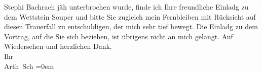 \begin{ledgroupsized}[t]{13cm}
{                  Stephi Bachrach}{}\label{K_L03019-2h} jäh unterbrochen wurde, finde ich Ihre freundliche Einladg zu
               dem Wettstein Souper und
                  bitte Sie zugleich mein Fernbleiben mit Rücksicht auf diesen
               Trauerfall zu entschuldigen, der mich sehr tief bewegt.\pend
           \pstart
           Die Einladg zu dem Vortrag, auf die Sie sich beziehen, ist übrigens nicht an mich
               gelangt.\pend
           \pstart
           Auf Wiedersehen und herzlichen Dank. {\\[\baselineskip]}Ihr {\\[\baselineskip]}\spacefill\mbox{Arth Sch}\pend
           \leftskip=0em{}
         
         \endnumbering{}\end{ledgroupsized}  \newcommand{\dateiname}{L03019}\newcommand{\titel}{Arthur Schnitzler an Felix Salten, 17. 5. 1917}\newcommand{\editorInnen}{Martin Anton Müller und Laura Untner}
      